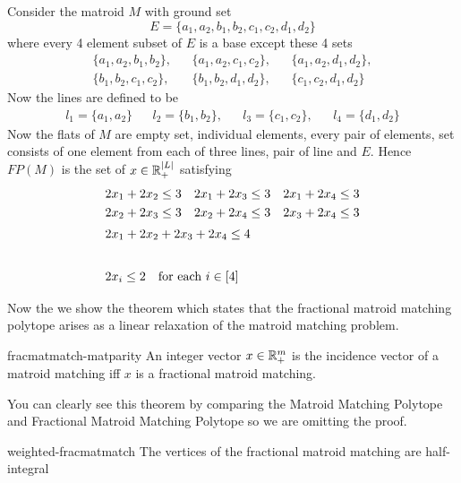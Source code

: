 \begin{example}{}{}
	Consider the matroid $M$ with ground set $$E=\{a_1,a_2,b_1,b_2,c_1,c_2,d_1,d_2\}$$where every 4 element subset of $E$ is a base except these 4 sets \begin{align*}
		\{a_1,a_2,b_1,b_2\}, &  & \{a_1,a_2,c_1,c_2\}, &  & \{a_1,a_2,d_1,d_2\}, \\
		\{b_1,b_2,c_1,c_2\}, &  & \{b_1,b_2,d_1,d_2\}, &  & \{c_1,c_2,d_1,d_2\}
	\end{align*}Now the lines are  defined to be \begin{align*}
		l_1=\{a_1,a_2\} &  & l_2=\{b_1,b_2\}, &  & l_3=\{c_1,c_2\}, &  & l_4=\{d_1,d_2\}
	\end{align*} Now the flats of $M$ are empty set, individual elements, every pair of elements, set consists of one element from each of three lines, pair of line and $E$. Hence $FP(M)$ is the set of $x\in\mathbb{R}^{|L|}_+$ satisfying \begin{align*}
		2x_1+2x_2\leq 3 &  & 2x_1+2x_3\leq 3 &  & 2x_1+2x_4\leq 3 \\
		2x_2+2x_3\leq 3 &  & 2x_2+2x_4\leq 3 &  & 2x_3+2x_4\leq 3 \\
		\shortintertext{\centering $2x_1+2x_2+2x_3+2x_4\leq 4$}   \\
		\shortintertext{\centering $2x_i\leq 2\quad \text{for each $i\in[4]$}$}
	\end{align*}
\end{example}
Now the we show the theorem  which states that the fractional matroid matching polytope arises
as a linear relaxation of the matroid matching problem.
\begin{Theorem}{\cite[Theoerm 2.1]{VandeVate_1992_Fmm}}{fracmatmatch-matparity}
	An integer vector $x\in\mathbb{R}^{m}_+$ is the incidence  vector of a matroid matching iff $x$ is a fractional matroid matching.
\end{Theorem}
You can clearly see this theorem by comparing the Matroid Matching Polytope and Fractional Matroid Matching Polytope so we are omitting the proof.
\begin{Theorem}{\cite[Theorem 1]{GijswijtPap_2013_Aaf}}{weighted-fracmatmatch}
	The vertices of the fractional matroid matching are half-integral
\end{Theorem}\parinn
